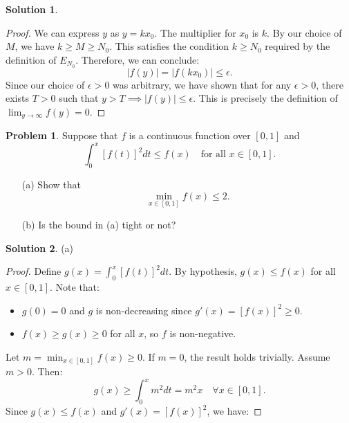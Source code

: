 \documentclass[12pt]{article}
\theoremstyle{definition}
\newtheorem*{solution}{\normalfont\textbf{Solution}}
\newtheorem*{Problem}{\noindent\textbf{Problem}}
\begin{document}
\begin{enumerate}[leftmargin=*]
\begin{solution}
\begin{proof}
                We can express \( y \) as \( y = k x_0 \). The multiplier for \( x_0 \) is \( k \). By our choice of \( M \), we have \( k \geq M \geq N_0 \). This satisfies the condition \( k \geq N_0 \) required by the definition of \( E_{N_0} \). Therefore, we can conclude:
                \[
                |f(y)| = |f(kx_0)| \leq \epsilon.
                \]
                Since our choice of \( \epsilon > 0 \) was arbitrary, we have shown that for any \( \epsilon > 0 \), there exists \( T>0 \) such that \( y > T \implies |f(y)| \leq \epsilon \). This is precisely the definition of \( \lim_{y \to \infty} f(y) = 0 \).
                \end{proof}
    \end{solution}
    
    \item \begin{Problem}
            Suppose that \( f \) is a continuous function over \( [0, 1] \) and
            \[
            \int_0^x [f(t)]^2 dt \leq f(x) \quad \text{for all } x \in [0, 1].
            \]
            \begin{enumerate}
                \item[(a)] Show that
                \[
                \min_{x \in [0, 1]} f(x) \leq 2.
                \]
                \item[(b)] Is the bound in (a) tight or not?
            \end{enumerate}
        \end{Problem}
        \begin{solution}
        \item[(a)]
            \begin{proof}
            Define \(g(x) = \int_0^x [f(t)]^2  dt\). By hypothesis, \(g(x) \leq f(x)\) for all \(x \in [0,1]\). Note that:
            \begin{itemize}
                \item \(g(0) = 0\) and \(g\) is non-decreasing since \(g'(x) = [f(x)]^2 \geq 0\).
                \item \(f(x) \geq g(x) \geq 0\) for all \(x\), so \(f\) is non-negative.
            \end{itemize}
            Let \(m = \min_{x \in [0,1]} f(x) \geq 0\). If \(m = 0\), the result holds trivially. Assume \(m > 0\). Then:
            \[
            g(x) \geq \int_0^x m^2  dt = m^2 x \quad \forall x \in [0,1].
            \]
            Since \(g(x) \leq f(x)\) and \(g'(x) = [f(x)]^2\), we have:

\end{proof}
\end{solution}
\end{enumerate}
\end{document}
